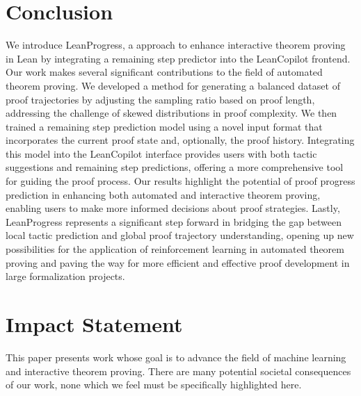 \section{Conclusion}

We introduce LeanProgress, a approach to enhance interactive theorem proving in Lean by integrating a remaining step predictor into the LeanCopilot frontend. Our work makes several significant contributions to the field of automated theorem proving. We developed a method for generating a balanced dataset of proof trajectories by adjusting the sampling ratio based on proof length, addressing the challenge of skewed distributions in proof complexity. We then trained a remaining step prediction model using a novel input format that incorporates the current proof state and, optionally, the proof history. Integrating this model into the LeanCopilot interface provides users with both tactic suggestions and remaining step predictions, offering a more comprehensive tool for guiding the proof process. Our results highlight the potential of proof progress prediction in enhancing both automated and interactive theorem proving, enabling users to make more informed decisions about proof strategies. Lastly, LeanProgress represents a significant step forward in bridging the gap between local tactic prediction and global proof trajectory understanding, opening up new possibilities for the application of reinforcement learning in automated theorem proving and paving the way for more efficient and effective proof development in large formalization projects.


\section{Impact Statement}
This paper presents work whose goal is to advance the field of machine learning and interactive theorem proving. There are many potential societal consequences of our work, none which we feel must be specifically highlighted here.
